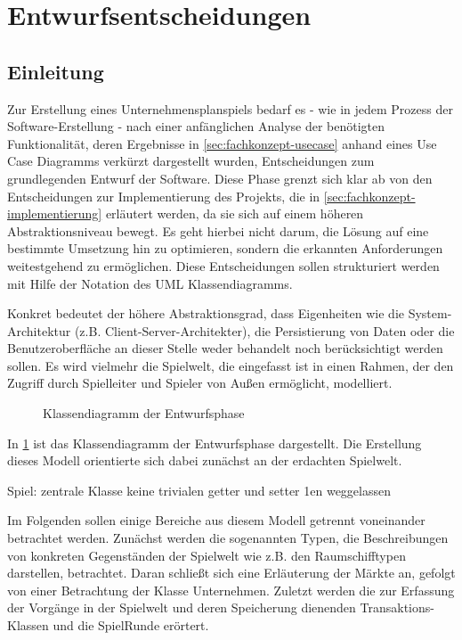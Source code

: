 \section{Entwurfsentscheidungen}
\label{sec:fachkonzept-entwurf}

\subsection{Einleitung}
Zur Erstellung eines Unternehmensplanspiels bedarf es - wie in jedem Prozess der Software-Erstellung - nach einer anfänglichen Analyse der benötigten Funktionalität, deren Ergebnisse in \ref{sec:fachkonzept-usecase} anhand eines Use Case Diagramms verkürzt dargestellt wurden, Entscheidungen zum grundlegenden Entwurf der Software. Diese Phase grenzt sich klar ab von den Entscheidungen zur Implementierung des Projekts, die in \ref{sec:fachkonzept-implementierung} erläutert werden, da sie sich auf einem höheren Abstraktionsniveau bewegt. Es geht hierbei nicht darum, die Lösung auf eine bestimmte Umsetzung hin zu optimieren, sondern die erkannten Anforderungen weitestgehend zu ermöglichen. Diese Entscheidungen sollen strukturiert werden mit Hilfe der Notation des UML Klassendiagramms.

Konkret bedeutet der höhere Abstraktionsgrad, dass Eigenheiten wie die System-Architektur (z.B. Client-Server-Architekter), die Persistierung von Daten oder die Benutzeroberfläche an dieser Stelle weder behandelt noch berücksichtigt werden sollen. Es wird vielmehr die Spielwelt, die eingefasst ist in einen Rahmen, der den Zugriff durch Spielleiter und Spieler von Außen ermöglicht, modelliert.

\begin{figure}[ht]
\setlength\fboxrule{0pt}
\caption{Klassendiagramm der Entwurfsphase}
\label{img:fachkonzept-entwurf-klassendiagramm}
\end{figure}

In \ref{img:fachkonzept-entwurf-klassendiagramm} ist das Klassendiagramm der Entwurfsphase dargestellt. Die Erstellung dieses Modell orientierte sich dabei zunächst an der erdachten Spielwelt. 

Spiel: zentrale Klasse
keine trivialen getter und setter
1en weggelassen

Im Folgenden sollen einige Bereiche aus diesem Modell getrennt voneinander betrachtet werden. Zunächst werden die sogenannten Typen, die Beschreibungen von konkreten Gegenständen der Spielwelt wie z.B. den Raumschifftypen darstellen, betrachtet. Daran schließt sich eine Erläuterung der Märkte an, gefolgt von einer Betrachtung der Klasse Unternehmen. Zuletzt werden die zur Erfassung der Vorgänge in der Spielwelt und deren Speicherung dienenden Transaktions-Klassen und die SpielRunde erörtert.

